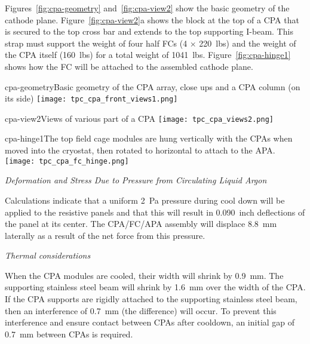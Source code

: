


Figures~\ref{fig:cpa-geometry} and~\ref{fig:cpa-view2} show the basic geometry of the cathode plane. Figure~\ref{fig:cpa-view2}a shows the block at the top of a CPA that is secured to the top cross bar and extends to the top supporting I-beam.  This strap  must support the weight of four half FCs (4 $\times$ 220~lbs) and the weight of the CPA itself (160~lbs) for a total weight of 1041~lbs.  Figure~\ref{fig:cpa-hinge1} shows how the FC will be attached to the assembled cathode plane. 

\begin{cdrfigure}{cpa-geometry}{Basic geometry of the CPA array, close ups and a CPA column (on its side)} 
\texttt{[image: tpc\_cpa\_front\_views1.png]}
\end{cdrfigure}

\begin{cdrfigure}{cpa-view2}{Views of various part of a CPA} 
\texttt{[image: tpc\_cpa\_views2.png]}
\end{cdrfigure}

\begin{cdrfigure}{cpa-hinge1}{The top field cage modules are hung vertically with the CPAs when moved into the cryostat, then rotated to horizontal to attach to the APA.} 
\texttt{[image: tpc\_cpa\_fc\_hinge.png]}
\end{cdrfigure}


{\it Deformation and Stress Due to Pressure from Circulating Liquid Argon}

Calculations %
indicate that a uniform 2~Pa pressure during cool down will be applied to the resistive panels  and that this will result in 0.090~inch deflections of the panel at its center.  The CPA/FC/APA assembly will displace 8.8~mm laterally as a result of the net force from this pressure.  

{\it Thermal considerations}

When the CPA modules are cooled, their width will shrink by 0.9~mm.  The supporting stainless steel beam will shrink by 1.6~mm over the width of the CPA.  If the CPA supports are rigidly attached to the supporting stainless steel beam, then an interference of 0.7~mm (the difference) will occur.  To prevent this interference and ensure contact between CPAs after cooldown, an initial gap of 0.7~mm between CPAs is required.  

